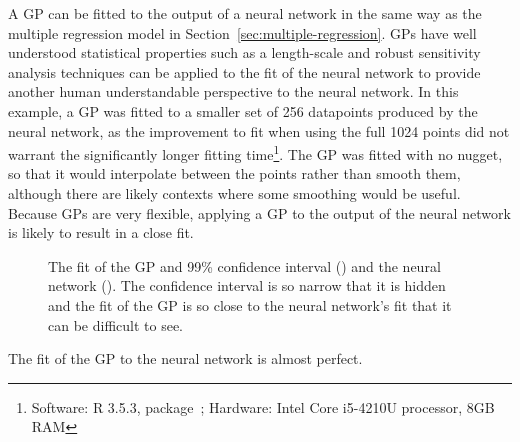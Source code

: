 A \ac{GP} can be fitted to the output of a neural network in the same way as the multiple regression model in Section~\ref{sec:multiple-regression}.
\acp{GP} have well understood statistical properties such as a length-scale and robust sensitivity analysis techniques can be applied to the fit of the neural network to provide another human understandable perspective to the neural network.
In this example, a \ac{GP} was fitted to a smaller set of 256 datapoints produced by the neural network, as the improvement to fit when using the full 1024 points did not warrant the significantly longer fitting time\footnote{Software: R 3.5.3,  package~\autocite{dancik2008}; Hardware: Intel Core i5-4210U processor, 8GB RAM}.
The \ac{GP} was fitted with no nugget, so that it would interpolate between the points rather than smooth them, although there are likely contexts where some smoothing would be useful.
Because \acp{GP} are very flexible, applying a \ac{GP} to the output of the neural network is likely to result in a close fit.

\begin{figure}[htbp]
	\centering
	
	\caption{The fit of the \ac{GP} and 99\% confidence interval (\gpcolour) and the neural network (\nncolour). The confidence interval is so narrow that it is hidden and the fit of the \ac{GP} is so close to the neural network's fit that it can be difficult to see.}
	\label{fig:gp-fit}
\end{figure}

The fit of the \ac{GP} to the neural network is almost perfect.


